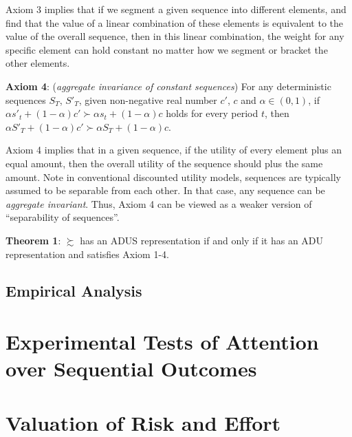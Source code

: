 \documentclass[
  12pt,
]{article}
\begin{document}
Axiom 3 implies that if we segment a given sequence into different
elements, and find that the value of a linear combination of these
elements is equivalent to the value of the overall sequence, then in
this linear combination, the weight for any specific element can hold
constant no matter how we segment or bracket the other elements.

\textbf{Axiom 4}: (\emph{aggregate invariance of constant sequences})
For any deterministic sequences \(S_T\), \(S'_T\), given non-negative
real number \(c'\), \(c\) and \(\alpha\in(0,1)\), if
\(\alpha s'_t+(1-\alpha)c'\succ\alpha s_t+(1-\alpha)c\) holds for every
period \(t\), then
\(\alpha S'_T+(1-\alpha)c'\succ \alpha S_T+(1-\alpha)c\).

Axiom 4 implies that in a given sequence, if the utility of every
element plus an equal amount, then the overall utility of the sequence
should plus the same amount. Note in conventional discounted utility
models, sequences are typically assumed to be separable from each other.
In that case, any sequence can be \emph{aggregate invariant}. Thus,
Axiom 4 can be viewed as a weaker version of ``separability of
sequences''.

\textbf{Theorem 1}: \(\succsim\) has an ADUS representation if and only
if it has an ADU representation and satisfies Axiom 1-4.

\hypertarget{empirical-analysis}{%
\subsection{Empirical Analysis}\label{empirical-analysis}}

\hypertarget{experimental-tests-of-attention-over-sequential-outcomes}{%
\section{Experimental Tests of Attention over Sequential
Outcomes}\label{experimental-tests-of-attention-over-sequential-outcomes}}

\hypertarget{valuation-of-risk-and-effort}{%
\section{Valuation of Risk and
Effort}\label{valuation-of-risk-and-effort}}

\renewcommand\refname{Time Schedule}
  
\end{document}
